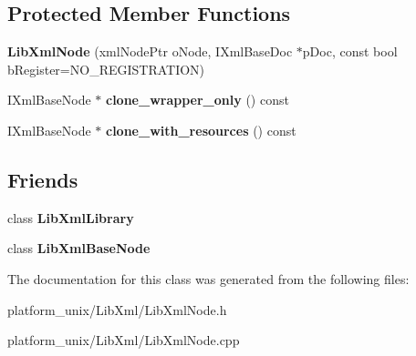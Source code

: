 \subsection*{\-Protected \-Member \-Functions}
\begin{DoxyCompactItemize}
\item 
\hypertarget{classgeneral__server_1_1LibXmlNode_ab4bdee8ab73f11483677f12affbd658d}{{\bfseries \-Lib\-Xml\-Node} (xml\-Node\-Ptr o\-Node, \-I\-Xml\-Base\-Doc $\ast$p\-Doc, const bool b\-Register=\-N\-O\-\_\-\-R\-E\-G\-I\-S\-T\-R\-A\-T\-I\-O\-N)}\label{classgeneral__server_1_1LibXmlNode_ab4bdee8ab73f11483677f12affbd658d}

\item 
\hypertarget{classgeneral__server_1_1LibXmlNode_aac16398eed8cb65294e4beaad94424f3}{\-I\-Xml\-Base\-Node $\ast$ {\bfseries clone\-\_\-wrapper\-\_\-only} () const }\label{classgeneral__server_1_1LibXmlNode_aac16398eed8cb65294e4beaad94424f3}

\item 
\hypertarget{classgeneral__server_1_1LibXmlNode_adf5665c19400327fcfda4f08ba0f23e4}{\-I\-Xml\-Base\-Node $\ast$ {\bfseries clone\-\_\-with\-\_\-resources} () const }\label{classgeneral__server_1_1LibXmlNode_adf5665c19400327fcfda4f08ba0f23e4}

\end{DoxyCompactItemize}
\subsection*{\-Friends}
\begin{DoxyCompactItemize}
\item 
\hypertarget{classgeneral__server_1_1LibXmlNode_ab76a8c8b514e08e13c811de729a94ce4}{class {\bfseries \-Lib\-Xml\-Library}}\label{classgeneral__server_1_1LibXmlNode_ab76a8c8b514e08e13c811de729a94ce4}

\item 
\hypertarget{classgeneral__server_1_1LibXmlNode_a7453902acf459394d1b514ac726ca9a2}{class {\bfseries \-Lib\-Xml\-Base\-Node}}\label{classgeneral__server_1_1LibXmlNode_a7453902acf459394d1b514ac726ca9a2}

\end{DoxyCompactItemize}


\-The documentation for this class was generated from the following files\-:\begin{DoxyCompactItemize}
\item 
platform\-\_\-unix/\-Lib\-Xml/\-Lib\-Xml\-Node.\-h\item 
platform\-\_\-unix/\-Lib\-Xml/\-Lib\-Xml\-Node.\-cpp\end{DoxyCompactItemize}
